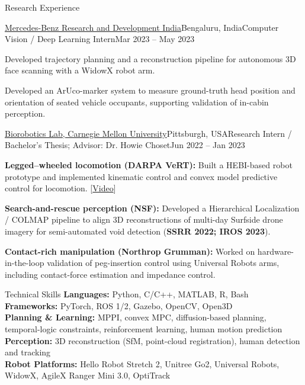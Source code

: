 \documentclass{resume}
\begin{document}
\begin{rSection}{Research Experience}
\begin{rSubsection}{\href{https://www.mbrdi.co.in/}{Mercedes-Benz Research and Development India}}{Bengaluru, India}{Computer Vision / Deep Learning Intern}{Mar 2023 -- May 2023}
\item Developed trajectory planning and a reconstruction pipeline for autonomous 3D face scanning with a WidowX robot arm.
\item Developed an ArUco-marker system to measure ground-truth head position and orientation of seated vehicle occupants, supporting validation of in-cabin perception.
\end{rSubsection}

\begin{rSubsection}{\href{https://biorobotics.ri.cmu.edu/}{Biorobotics Lab, Carnegie Mellon University}}{Pittsburgh, USA}{Research Intern / Bachelor's Thesis; Advisor: Dr. Howie Choset}{Jun 2022 -- Jan 2023}
\item {\bf Legged--wheeled locomotion (DARPA VeRT):} Built a HEBI-based robot prototype and implemented kinematic control and convex model predictive control for locomotion. [\href{https://drive.google.com/file/d/1BbIZ1sqgupsLpDIYjUZfTdsq0vR_bh4T/view}{Video}]
\item {\bf Search-and-rescue perception (NSF):} Developed a Hierarchical Localization / COLMAP pipeline to align 3D reconstructions of multi-day Surfside drone imagery for semi-automated void detection ({\bf SSRR 2022; IROS 2023}).
\item {\bf Contact-rich manipulation (Northrop Grumman):} Worked on hardware-in-the-loop validation of peg-insertion control using Universal Robots arms, including contact-force estimation and impedance control.
\end{rSubsection}
\end{rSection}

\begin{rSection}{Technical Skills}
{\bf Languages:} Python, C/C++, MATLAB, R, Bash
\\ {\bf Frameworks:} PyTorch, ROS 1/2, Gazebo, OpenCV, Open3D
\\ {\bf Planning \& Learning:} MPPI, convex MPC, diffusion-based planning, temporal-logic constraints, reinforcement learning, human motion prediction
\\ {\bf Perception:} 3D reconstruction (SfM, point-cloud registration), human detection and tracking
\\ {\bf Robot Platforms:} Hello Robot Stretch 2, Unitree Go2, Universal Robots, WidowX, AgileX Ranger Mini 3.0, OptiTrack
\end{rSection}
\end{document}
